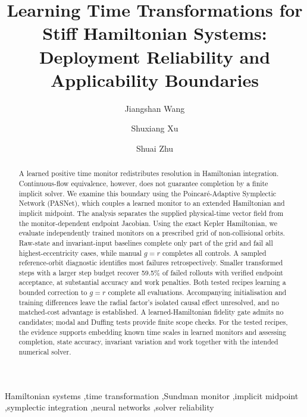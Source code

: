 \documentclass[final,3p,times]{elsarticle}
\begin{document}
\begin{frontmatter}
\title{Learning Time Transformations for Stiff Hamiltonian Systems:
Deployment Reliability and Applicability Boundaries}
\author[naval]{Jiangshan Wang}
\author[guizhou]{Shuxiang Xu}
\author[corex]{Shuai Zhu}

\begin{abstract}
A learned positive time monitor redistributes resolution in Hamiltonian
integration. Continuous-flow equivalence, however, does not guarantee
completion by a finite implicit solver. We examine this boundary using the
Poincar\'e-Adaptive Symplectic Network (PASNet), which couples a learned
monitor to an extended Hamiltonian and implicit midpoint. The analysis
separates the supplied physical-time vector field from the
monitor-dependent endpoint Jacobian. Using the exact Kepler Hamiltonian,
we evaluate independently trained monitors on a prescribed grid of
non-collisional orbits. Raw-state and invariant-input baselines complete
only part of the grid and fail all highest-eccentricity cases, while
manual $g=r$ completes all controls. A sampled reference-orbit diagnostic
identifies most failures retrospectively. Smaller transformed steps with
a larger step budget recover 59.5\% of failed rollouts with verified
endpoint acceptance, at substantial accuracy and work penalties.
Both tested recipes learning a bounded correction to $g=r$ complete all
evaluations. Accompanying initialisation and training differences leave
the radial factor's isolated causal effect unresolved, and no matched-cost
advantage is established. A learned-Hamiltonian fidelity gate admits no
candidates; modal and Duffing tests provide finite scope checks. For the
tested recipes, the evidence supports embedding known time scales in
learned monitors and assessing completion, state accuracy, invariant
variation and work together with the intended numerical solver.
\end{abstract}

\begin{keyword}
Hamiltonian systems \sep time transformation \sep Sundman monitor
\sep implicit midpoint \sep symplectic integration \sep neural networks
\sep solver reliability
\end{keyword}
\end{frontmatter}
\linenumbers
\end{document}
